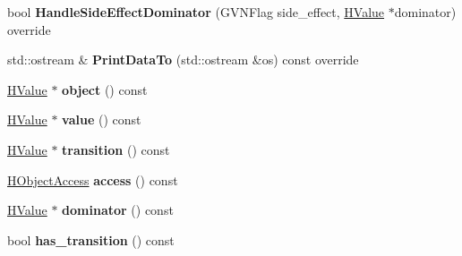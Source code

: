 \begin{DoxyCompactItemize}
\item 
bool {\bfseries Handle\+Side\+Effect\+Dominator} (G\+V\+N\+Flag side\+\_\+effect, \hyperlink{classv8_1_1internal_1_1_h_value}{H\+Value} $\ast$dominator) override\hypertarget{classv8_1_1internal_1_1_h_store_named_field_a6a03a7ca54dab99ae3061257c309853d}{}\label{classv8_1_1internal_1_1_h_store_named_field_a6a03a7ca54dab99ae3061257c309853d}

\item 
std\+::ostream \& {\bfseries Print\+Data\+To} (std\+::ostream \&os) const  override\hypertarget{classv8_1_1internal_1_1_h_store_named_field_afcef0bdf2eaef4ed4b935e83411b23be}{}\label{classv8_1_1internal_1_1_h_store_named_field_afcef0bdf2eaef4ed4b935e83411b23be}

\item 
\hyperlink{classv8_1_1internal_1_1_h_value}{H\+Value} $\ast$ {\bfseries object} () const \hypertarget{classv8_1_1internal_1_1_h_store_named_field_a06a4b1fdb7dbd7b8b9a10bb61d641797}{}\label{classv8_1_1internal_1_1_h_store_named_field_a06a4b1fdb7dbd7b8b9a10bb61d641797}

\item 
\hyperlink{classv8_1_1internal_1_1_h_value}{H\+Value} $\ast$ {\bfseries value} () const \hypertarget{classv8_1_1internal_1_1_h_store_named_field_a361ce3d883660bc38e992b78bdf36c1e}{}\label{classv8_1_1internal_1_1_h_store_named_field_a361ce3d883660bc38e992b78bdf36c1e}

\item 
\hyperlink{classv8_1_1internal_1_1_h_value}{H\+Value} $\ast$ {\bfseries transition} () const \hypertarget{classv8_1_1internal_1_1_h_store_named_field_a32f8a8c5540946735b489121dcbb0e55}{}\label{classv8_1_1internal_1_1_h_store_named_field_a32f8a8c5540946735b489121dcbb0e55}

\item 
\hyperlink{classv8_1_1internal_1_1_h_object_access}{H\+Object\+Access} {\bfseries access} () const \hypertarget{classv8_1_1internal_1_1_h_store_named_field_ac83f4c225ccd341afdd24127a3870d79}{}\label{classv8_1_1internal_1_1_h_store_named_field_ac83f4c225ccd341afdd24127a3870d79}

\item 
\hyperlink{classv8_1_1internal_1_1_h_value}{H\+Value} $\ast$ {\bfseries dominator} () const \hypertarget{classv8_1_1internal_1_1_h_store_named_field_a98887a21cca457904ebdca06b04fdc54}{}\label{classv8_1_1internal_1_1_h_store_named_field_a98887a21cca457904ebdca06b04fdc54}

\item 
bool {\bfseries has\+\_\+transition} () const \hypertarget{classv8_1_1internal_1_1_h_store_named_field_a21b13147f326c1eb3160fcf9ee60ca9c}{}\label{classv8_1_1internal_1_1_h_store_named_field_a21b13147f326c1eb3160fcf9ee60ca9c}


\end{DoxyCompactItemize}
